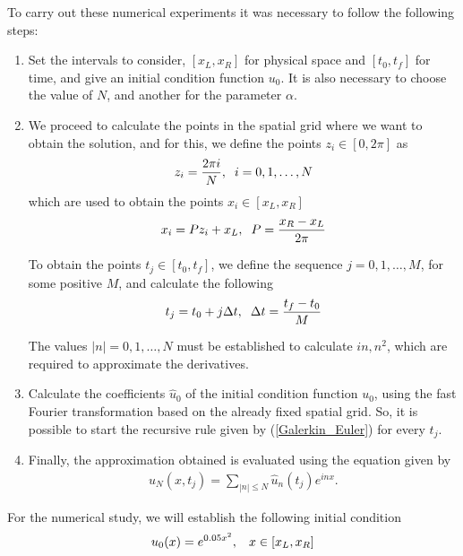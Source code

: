 		To carry out these numerical experiments it was necessary to follow the following steps:
		\begin{enumerate}
			\item Set the intervals to consider, $[x_L, x_R]$ for physical space and $[t_0, t_f]$ for time, and give an initial condition function $u_0$. It is also necessary to choose the value of $N$, and another for the parameter $\alpha$. 
			
			\item We proceed to calculate the points in the spatial grid where we want to obtain the solution, and for this, we define the points $z_i \in [0, 2 \pi]$ as
			\begin{align*}
				z_i = \frac{2 \pi i}{N}, \hspace{2mm} i = 0, 1, \dots, N
			\end{align*}
			which are used to obtain the points $x_i \in [x_L, x_R]$
			\begin{align*}
				x_i = P z_i + x_L, \hspace{2mm} P = \frac{x_R - x_L}{2 \pi}
			\end{align*}
			
			To obtain the points $t_j \in [t_0, t_f]$, we define the sequence $j = 0, 1, \dots, M$, for some positive $M$, and calculate the following
			\begin{align*}
				t_j = t_0 + j \Delta t, \hspace{2mm} \Delta t = \frac{t_f - t_0}{M} 
			\end{align*}
			
			The values $| n | = 0, 1, \dots, N $ must be established to calculate $in, n^2$, which are required to approximate the derivatives.
			 
			\item Calculate the coefficients $\hat{u}_0$ of the initial condition function $u_0$, using the fast Fourier transformation based on the already fixed spatial grid. So, it is possible to start the recursive rule given by (\ref{Galerkin_Euler}) for every $t_j$.
			
			\item Finally, the approximation obtained is evaluated using the equation given by
			\begin{align*}
				u_N(x, t_j) = \displaystyle \sum_{|n| \leq N} \hat{u}_n (t_j) e^{inx}.
			\end{align*}
		\end{enumerate}
		
		For the numerical study, we will establish the following initial condition
		\begin{align}
			\label{IC}
			u_0 (x) = e^{0.05 x^2}, \hspace{3mm} x \in [x_L, x_R] 
		\end{align}
		
